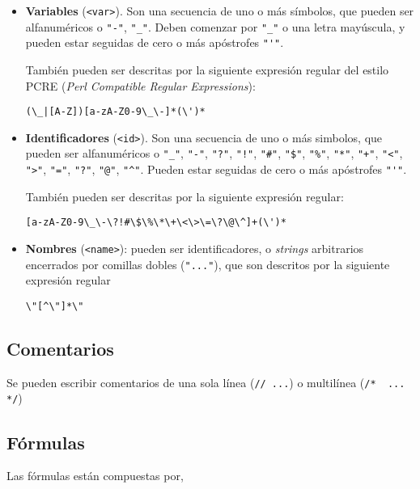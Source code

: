 \begin{itemize}
    \item \textbf{Variables} (\lstinline{<var>}).
    Son una secuencia de uno o más símbolos, que pueden ser alfanuméricos o  \verb/"-"/, \verb/"_"/. Deben comenzar por \verb/"_"/ o una letra
    mayúscula, y pueden estar seguidas de cero o más apóstrofes
    \verb/"'"/.

    También pueden ser descritas
    por la siguiente expresión regular del estilo PCRE (\textit{Perl Compatible
    Regular Expressions}):
    \begin{center}
        \verb/(\_|[A-Z])[a-zA-Z0-9\_\-]*(\')*/
    \end{center}
    \item \textbf{Identificadores} (\lstinline{<id>}).
    Son una secuencia de uno o más simbolos, que pueden ser alfanuméricos o 
    \verb/"_"/, \verb/"-"/, \verb/"?"/, \verb/"!"/, \verb/"#"/, \verb/"$"/,
    \verb/"%"/, \verb/"*"/, \verb/"+"/, \verb/"<"/, \verb/">"/, \verb/"="/, \verb/"?"/, \verb/"@"/, \verb/"^"/. Pueden estar seguidas de cero o más apóstrofes
    \verb/"'"/.

    También pueden ser
    descritas por la siguiente expresión regular:
    \begin{center}
        \verb/[a-zA-Z0-9\_\-\?!#\$\%\*\+\<\>\=\?\@\^]+(\')*/
    \end{center}
    \item \textbf{Nombres} (\lstinline{<name>}): pueden ser identificadores, o
    \textit{strings} arbitrarios encerrados por comillas dobles
    (\texttt{"..."}), que son descritos por la siguiente expresión regular
    \begin{center}
        \verb/\"[^\"]*\"/
    \end{center}
\end{itemize}

\subsection{Comentarios}

Se pueden escribir comentarios de una sola línea (\lstinline{// ...}) o multilínea
(\lstinline{/*  ... */})

\subsection{Fórmulas}

Las fórmulas están compuestas por,

